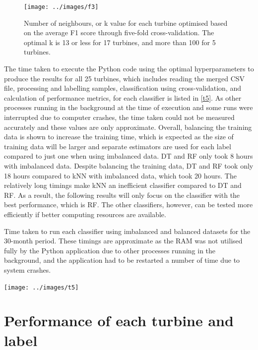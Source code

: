 \begin{figure}
  \centering
  \texttt{[image: ../images/f3]}
  \caption{\label{f3}Number of neighbours, or k value for each turbine
  optimised based on the average F1 score through five-fold cross-validation.
  The optimal k is 13 or less for 17 turbines, and more than 100 for 5
  turbines.}
\end{figure}

The time taken to execute the Python code using the optimal hyperparameters to
produce the results for all 25 turbines, which includes reading the merged CSV
file, processing and labelling samples, classification using cross-validation,
and calculation of performance metrics, for each classifier is listed in
\autoref{t5}. As other processes running in the background at the time of
execution and some runs were interrupted due to computer crashes, the time
taken could not be measured accurately and these values are only approximate.
Overall, balancing the training data is shown to increase the training time,
which is expected as the size of training data will be larger and separate
estimators are used for each label compared to just one when using imbalanced
data. DT and RF only took 8 hours with imbalanced data. Despite balancing the
training data, DT and RF took only 18 hours compared to kNN with imbalanced
data, which took 20 hours. The relatively long timings make kNN an inefficient
classifier compared to DT and RF. As a result, the following results will only
focus on the classifier with the best performance, which is RF. The other
classifiers, however, can be tested more efficiently if better computing
resources are available.

\begin{table}
  \centering
  \caption{\label{t5}Time taken to run each classifier using imbalanced and
  balanced datasets for the 30-month period. These timings are approximate as
  the RAM was not utilised fully by the Python application due to other
  processes running in the background, and the application had to be restarted
  a number of time due to system crashes.}
  \texttt{[image: ../images/t5]}
\end{table}

\section{Performance of each turbine and label}


